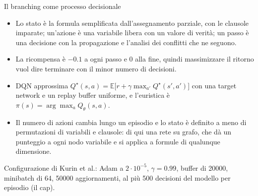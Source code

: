 \documentclass[aspectratio=169]{beamer}
\newcommand{\T}[2]{#2}
\newcommand{\T}[2]{#1}
\begin{document}
\begin{frame}{\T{Branching as a decision process}{Il branching come processo decisionale}}
  \begin{itemize}
    \item \T{The state is the formula simplified by the partial assignment, with the learned
          clauses; an action is an unassigned variable with a truth value; a step is one
          decision with the propagation and the conflict analysis it triggers.}%
          {Lo stato \`e la formula semplificata dall'assegnamento parziale, con le clausole
          imparate; un'azione \`e una variabile libera con un valore di verit\`a; un passo \`e
          una decisione con la propagazione e l'analisi dei conflitti che ne seguono.}
    \item \T{The reward is $-0.1$ at each step and $0$ at termination, so that maximizing the
          return means terminating in as few decisions as possible.}%
          {La ricompensa \`e $-0.1$ a ogni passo e $0$ alla fine, quindi massimizzare il
          ritorno vuol dire terminare con il minor numero di decisioni.}
    \item \T{DQN approximates}{DQN approssima}
          $Q^\star(s,a) = \mathbb E\big[r + \gamma \max_{a'} Q^\star(s',a')\big]$
          \T{with a target network and a uniform replay buffer, and the heuristic is}%
          {con una target network e un replay buffer uniforme, e l'euristica \`e}
          $\pi(s) = \arg\max_a Q_\theta(s,a)$.
    \item \T{The number of actions changes along an episode and the state is defined up to
          a permutation of variables and clauses: hence a graph network, which scores each
          variable node and applies to formulas of any size.}%
          {Il numero di azioni cambia lungo un episodio e lo stato \`e definito a meno di
          permutazioni di variabili e clausole: di qui una rete su grafo, che d\`a un punteggio
          a ogni nodo variabile e si applica a formule di qualunque dimensione.}
  \end{itemize}
  {\footnotesize\color{lamalunga-muted}\T{Configuration of Kurin et al.: Adam at $2\cdot10^{-5}$,
  $\gamma=0.99$, buffer of 20000, minibatches of 64, 50000 updates, at most 500 decisions of
  the model per episode (the cap).}{Configurazione di Kurin et al.: Adam a $2\cdot10^{-5}$,
  $\gamma=0.99$, buffer di 20000, minibatch di 64, 50000 aggiornamenti, al pi\`u 500 decisioni
  del modello per episodio (il cap).}\par}
\end{frame}
\end{document}
